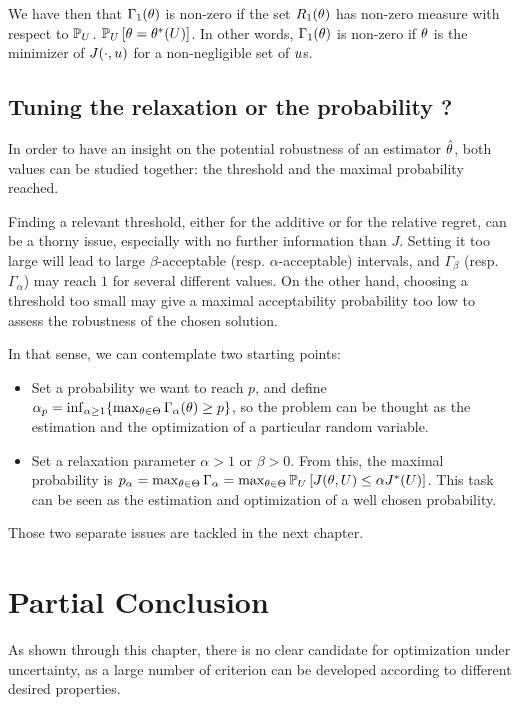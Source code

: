 \documentclass[../../Main_ManuscritThese.tex]{subfiles}
\begin{document}
We have then that $\Gamma_1(\kk) %
$ is non-zero if the set $R_1(\theta)$ has non-zero measure with respect to $\mathbb{P}_{U}$.
$\mathbb{P}_{U}\left[\theta=\theta^*(U)\right]$. In other words, $\Gamma_1(\theta)$ is non-zero if $\theta$ is the minimizer of $J(\cdot,u)$ for a non-negligible set of $u$s.





\subsection{Tuning the relaxation or the probability ?}
\label{sec:choice_threshold}
  In order to have an insight on the potential robustness of an estimator $\hat{\theta}_{\mathrm{}}$, both values can be studied together: the threshold and the maximal probability reached.

  
Finding a relevant threshold, either for the additive or for the relative regret,  can be a thorny issue, especially with no further information than $J$. Setting it too large will lead to large $\beta$-acceptable (resp. $\alpha$-acceptable) intervals, and $\Gamma_\beta$ (resp. $\Gamma_\alpha$) may reach $1$ for several different values. On the other hand, choosing a threshold too small may give a maximal acceptability probability too low to assess the robustness of the chosen solution.

In that sense, we can contemplate two starting points:
\begin{itemize}
\item Set a probability we want to reach $p$, and define $\alpha_p = \inf_{\alpha \geq 1}\{\max_{\theta \in \Theta}\Gamma_{\alpha}(\theta)\geq p \}$, so the problem can be thought as the estimation and the optimization of a particular random variable.
\item Set a relaxation parameter $\alpha > 1$ or $\beta > 0$. From this, the maximal probability is $p_{\alpha} = \max_{\theta\in\Theta} \Gamma_{\alpha} = \max_{\theta\in\Theta} \mathbb{P}_{U}\left[J(\theta, U) \leq \alpha J^*(U)\right]$. This task can be seen as the estimation and optimization of a well chosen probability.
\end{itemize}

Those two separate issues are tackled in the next chapter.


\section{Partial Conclusion}
\label{sec:ch3_partial_ccl}
As shown through this chapter, there is no clear candidate for optimization under uncertainty, 
 as a large number of criterion can be developed according to different desired properties.
\end{document}
